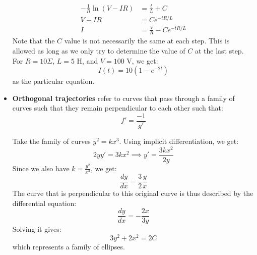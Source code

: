 \begin{itemize}
\begin{example}
\begin{align}
            -\frac{1}{R}\ln(V-IR) &= \frac{t}{L}+C \\ 
            V-IR &= Ce^{-tR/L} \\ 
            I &= \frac{V}{R} - Ce^{-tR/L}
        \end{align}
        Note that the $C$ value is not necessarily the same at each step. This is allowed as long as we only try to determine the value of $C$ at the last step. For $R=10 \Sigma$, $L= 5\text{ H}$, and $V=100\text{ V}$, we get:
        \begin{equation}
            I(t) = 10(1-e^{-2t})
            \label{eq:}
        \end{equation}
        as the particular equation.
    \end{example}
    \item \textbf{Orthogonal trajectories} refer to curves that pass through a family of curves such that they remain perpendicular to each other such that:
    \begin{equation}
        f' = \frac{-1}{g'}
        \label{eq:}
    \end{equation}
    \begin{example}
        Take the family of curves $y^2=kx^3$. Using implicit differentiation, we get:
        \begin{equation}
            2yy' = 3kx^2 \implies y' = \frac{3kx^2}{2y}
            \label{eq:}
        \end{equation}
        Since we also have $k=\frac{y^2}{x^3}$, we get:
        \begin{equation}
            \frac{dy}{dx} = \frac{3}{2}\frac{y}{x}
            \label{eq:}
        \end{equation}
        The curve that is perpendicular to this original curve is thus described by the differential equation:
        \begin{equation}
            \frac{dy}{dx} = -\frac{2x}{3y}
            \label{eq:}
        \end{equation}
        Solving it gives:
        \begin{equation}
            3y^2+2x^2=2C
            \label{eq:}
        \end{equation}
        which represents a family of ellipses.
    \end{example}
\end{itemize}